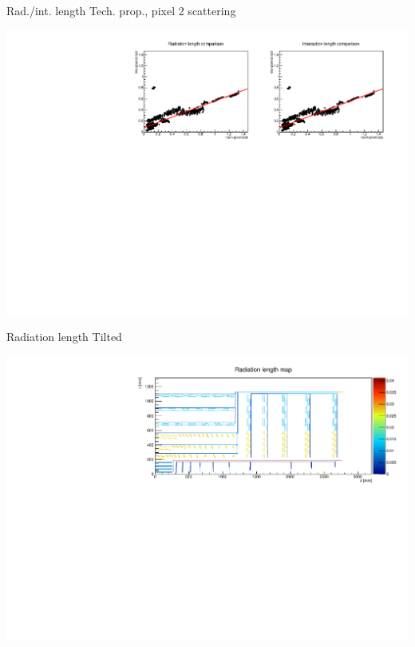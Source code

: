 \documentclass[pdftex, 11pt]{beamer}
\begin{document}
\begin{frame}{Rad./int. length Tech. prop., pixel 2 scattering}
  \begin{center}
    \includegraphics[width=\textwidth]{img/pixel-2-scattering.pdf}
  \end{center}
\end{frame}

\begin{frame}{Radiation length Tilted}
  \begin{center}
    \includegraphics[width=\textwidth]{img/rad-tilted.pdf}
  \end{center}
\end{frame}
\end{document}
